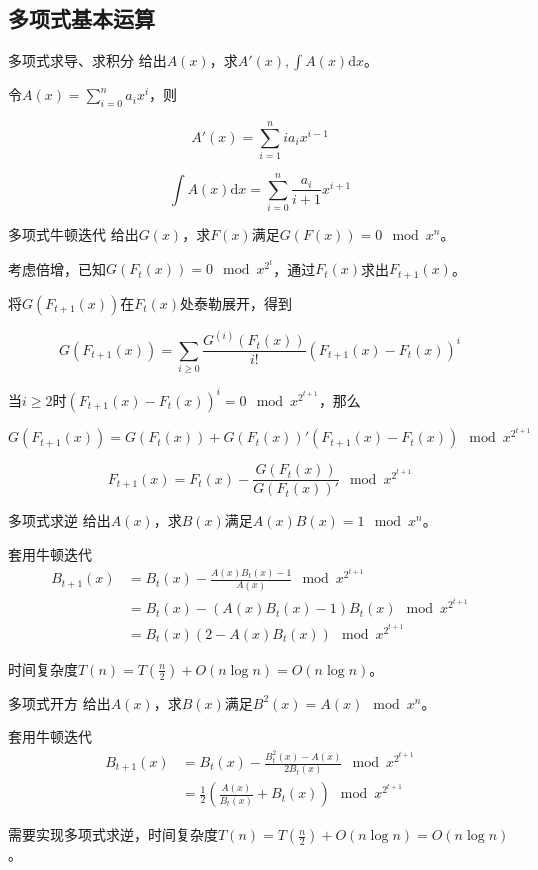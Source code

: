 \documentclass{beamer}
\begin{document}
	\subsection{多项式基本运算}
	\begin{frame}{多项式求导、求积分}
		给出$A(x)$，求$A'(x),\int A(x)\mathrm dx$。
		
		令$A(x)=\sum\limits_{i=0}^na_ix^i$，则
		
		$$A'(x)=\sum_{i=1}^{n}ia_{i}x^{i-1}$$
		
		$$\int A(x)\mathrm dx=\sum_{i=0}^n\frac{a_i}{i+1}x^{i+1}$$
	\end{frame}
	\begin{frame}{多项式牛顿迭代}
		给出$G(x)$，求$F(x)$满足$G(F(x)) = 0 \mod x^n$。
		
		考虑倍增，已知$G(F_t(x)) = 0 \mod x^{2^t}$，通过$F_t(x)$求出$F_{t+1}(x)$。
		
		将$G(F_{t+1}(x))$在$F_t(x)$处泰勒展开，得到
		
		$$G(F_{t+1}(x))=\sum_{i\ge 0}\frac{G^{(i)}(F_t(x))}{i!}(F_{t+1}(x)-F_t(x))^i$$
		
		当$i \ge 2$时$(F_{t+1}(x)-F_t(x))^i = 0 \mod x^{2^{t+1}}$，那么
		
		$$G(F_{t+1}(x))=G(F_t(x))+G(F_t(x))'(F_{t+1}(x)-F_t(x)) \mod x^{2^{t+1}}$$

		$$F_{t+1}(x)=F_t(x)-\frac{G(F_t(x))}{G(F_t(x))'} \mod x^{2^{t+1}}$$
	\end{frame}
	\begin{frame}{多项式求逆}
		给出$A(x)$，求$B(x)$满足$A(x)B(x)=1 \mod x^n$。
		
		套用牛顿迭代
		$$\begin{aligned}B_{t+1}(x)&=B_t(x)-\frac{A(x)B_t(x)-1}{A(x)} \mod x^{2^{t+1}}\\&=B_t(x)-(A(x)B_t(x)-1)B_t(x)\mod x^{2^{t+1}}\\&=B_t(x)(2-A(x)B_t(x))\mod x^{2^{t+1}}\end{aligned}$$ 
		
		时间复杂度$T(n)=T(\frac n2)+O(n\log n)=O(n\log n)$。
	\end{frame}
	\begin{frame}{多项式开方}
		给出$A(x)$，求$B(x)$满足$B^2(x)=A(x) \mod x^n$。
		
		套用牛顿迭代
		$$\begin{aligned}B_{t+1}(x)&=B_t(x)-\frac{B_t^2(x)-A(x)}{2B_t(x)} \mod x^{2^{t+1}}\\&=\frac{1}{2}(\frac{A(x)}{B_t(x)}+B_t(x))\mod x^{2^{t+1}}\end{aligned}$$ 
		
		需要实现多项式求逆，时间复杂度$T(n)=T(\frac n2)+O(n\log n)=O(n\log n)$。
	\end{frame}
\end{document}

